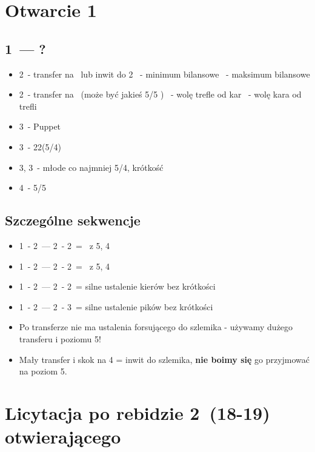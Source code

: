\documentclass[12pt, a4paper]{article}
\begin{document}
\pagebreak
\section{Otwarcie 1\ntx}
\subsection{1\ntx\ --- ?}
\begin{itemize}
    \item 2\spades\ - transfer na \clubs\ lub inwit do 2\nt
    \nt\ - minimum bilansowe
    \clubs\ - maksimum bilansowe
    \item 2\nt\ - transfer na \diams\ (może być jakieś 5/5 \minor)
    \clubs\ - wolę trefle od kar
    \diams\ - wolę kara od trefli
    \item 3\clubs\ - Puppet
    \item 3\diams\ - 22(5/4)
    \item 3\hearts, 3\spades\ - młode co najmniej 5/4, krótkość
    \item 4\clubs\ - 5/5 \major\
\end{itemize}

\subsection{Szczególne sekwencje}
\begin{itemize}
    \item 1\nt\ - 2\clubs\ --- 2\diams\ - 2\spades\ = \inv\ z 5\spades, 4\hearts
    \item 1\nt\ - 2\diams\ --- 2\hearts\ - 2\spades\ = \inv\ z 5\hearts, 4\spades
    \item 1\nt\ - 2\clubs\ --- 2\hearts\ - 2\spades\ = silne ustalenie kierów bez krótkości
    \item 1\nt\ - 2\clubs\ --- 2\spades\ - 3\hearts\ = silne ustalenie pików bez krótkości
    \item Po transferze nie ma ustalenia forsującego do szlemika - używamy dużego transferu i poziomu 5!
    \item Mały transfer i skok na 4 = inwit do szlemika, \textbf{nie boimy się} go przyjmować na poziom 5.
\end{itemize}



\pagebreak
\section{Licytacja po rebidzie 2\ntx\ (18-19) otwierającego}
\end{document}

